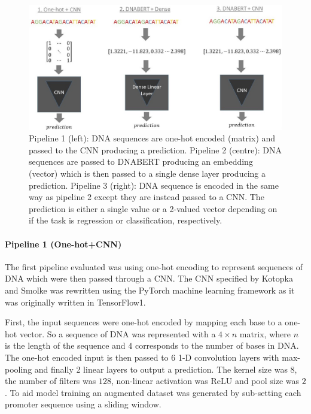 \documentclass{article}
\begin{document}
\begin{figure}[H]
    \centering
    \includegraphics[width=1\linewidth]{images/pipelines.jpg}
    \caption{Pipeline 1 (left): DNA sequences are one-hot encoded (matrix) and passed to the CNN producing a prediction. Pipeline 2 (centre): DNA sequences are passed to DNABERT producing an embedding (vector) which is then passed to a single dense layer producing a prediction. Pipeline 3 (right): DNA sequence is encoded in the same way as pipeline 2 except they are instead passed to a CNN. The prediction is either a single value or a 2-valued vector depending on if the task is regression or classification, respectively.}
    \label{fig:pipelines}
\end{figure}

\paragraph{Pipeline 1 (One-hot+CNN)} The first pipeline evaluated was using one-hot encoding to represent sequences of DNA which were then passed through a CNN. The CNN specified by Kotopka and Smolke \cite{smolke2020promoter} was rewritten using the PyTorch \cite{pytorch2019} machine learning framework as it was originally written in TensorFlow1. 

First, the input sequences were one-hot encoded by mapping each base to a one-hot vector. So a sequence of DNA was represented with a $4\times n$ matrix, where $n$ is the length of the sequence and $4$ corresponds to the number of bases in DNA. The one-hot encoded input is then passed to 6 1-D convolution layers with max-pooling and finally 2 linear layers to output a prediction. The kernel size was $8$, the number of filters was $128$, non-linear activation was ReLU and pool size was $2$. To aid model training an augmented dataset was generated by sub-setting each promoter sequence using a sliding window.
\end{document}
